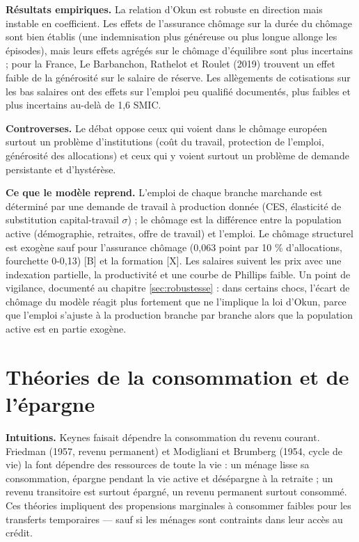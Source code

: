\documentclass[
  11pt,
  11pt,
  a4paper,
  openany]{book}
\begin{document}
\textbf{Résultats empiriques.} La relation d'Okun est robuste en
direction mais instable en coefficient. Les effets de l'assurance
chômage sur la durée du chômage sont bien établis (une indemnisation
plus généreuse ou plus longue allonge les épisodes), mais leurs effets
agrégés sur le chômage d'équilibre sont plus incertains ; pour la
France, Le Barbanchon, Rathelot et Roulet (2019) trouvent un effet
faible de la générosité sur le salaire de réserve. Les allègements de
cotisations sur les bas salaires ont des effets sur l'emploi peu
qualifié documentés, plus faibles et plus incertains au-delà de 1,6
SMIC.

\textbf{Controverses.} Le débat oppose ceux qui voient dans le chômage
européen surtout un problème d'institutions (coût du travail, protection
de l'emploi, générosité des allocations) et ceux qui y voient surtout un
problème de demande persistante et d'hystérèse.

\textbf{Ce que le modèle reprend.} L'emploi de chaque branche marchande
est déterminé par une demande de travail à production donnée (CES,
élasticité de substitution capital-travail \(\sigma\)) ; le chômage est
la différence entre la population active (démographie, retraites, offre
de travail) et l'emploi. Le chômage structurel est exogène sauf pour
l'assurance chômage (0,063 point par 10 \% d'allocations, fourchette
0-0,13) {[}B{]} et la formation {[}X{]}. Les salaires suivent les prix
avec une indexation partielle, la productivité et une courbe de Phillips
faible. Un point de vigilance, documenté au chapitre
\ref{sec:robustesse} : dans certains chocs, l'écart de chômage du modèle
réagit plus fortement que ne l'implique la loi d'Okun, parce que
l'emploi s'ajuste à la production branche par branche alors que la
population active est en partie exogène.

\hypertarget{sec:consommation}{%
\section{Théories de la consommation et de
l'épargne}\label{sec:consommation}}

\textbf{Intuitions.} Keynes faisait dépendre la consommation du revenu
courant. Friedman (1957, revenu permanent) et Modigliani et Brumberg
(1954, cycle de vie) la font dépendre des ressources de toute la vie :
un ménage lisse sa consommation, épargne pendant la vie active et
désépargne à la retraite ; un revenu transitoire est surtout épargné, un
revenu permanent surtout consommé. Ces théories impliquent des
propensions marginales à consommer faibles pour les transferts
temporaires --- sauf si les ménages sont contraints dans leur accès au
crédit.
\end{document}
